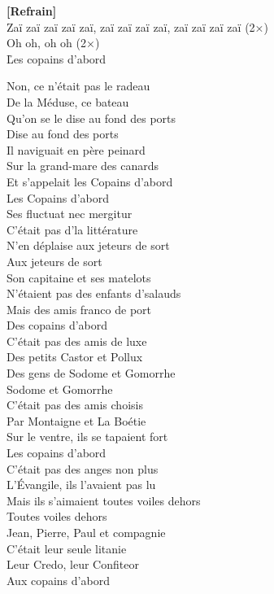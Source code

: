 \documentclass{novel}
\begin{document}
\textbf{[Refrain]} \\

Zaï zaï zaï zaï zaï, zaï zaï zaï zaï, zaï zaï zaï zaï (2×) \\

Oh oh, oh oh (2×) \\

\newpage
\normalsize
\h*{Les copains d’abord}

\begin{multicols}{2}

Non, ce n'était pas le radeau \\
De la Méduse, ce bateau \\
Qu'on se le dise au fond des ports \\
Dise au fond des ports \\
Il naviguait en père peinard \\
Sur la grand-mare des canards \\
Et s'appelait les Copains d'abord \\
Les Copains d'abord \\

Ses fluctuat nec mergitur \\
C'était pas d'la littérature \\
N'en déplaise aux jeteurs de sort \\
Aux jeteurs de sort \\
Son capitaine et ses matelots \\
N'étaient pas des enfants d'salauds \\
Mais des amis franco de port \\
Des copains d'abord \\

C'était pas des amis de luxe \\
Des petits Castor et Pollux \\
Des gens de Sodome et Gomorrhe \\
Sodome et Gomorrhe \\
C'était pas des amis choisis \\
Par Montaigne et La Boétie \\
Sur le ventre, ils se tapaient fort \\
Les copains d'abord \\

C'était pas des anges non plus \\
L'Évangile, ils l'avaient pas lu \\
Mais ils s'aimaient toutes voiles dehors \\
Toutes voiles dehors \\
Jean, Pierre, Paul et compagnie \\
C'était leur seule litanie \\
Leur Credo, leur Confiteor \\
Aux copains d'abord \\


\end{multicols}
\end{document}
